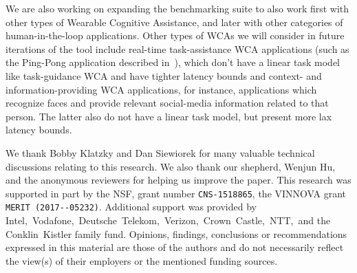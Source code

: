 We are also working on expanding the benchmarking suite to also work first with other types of Wearable Cognitive Assistance, and later with other categories of human-in-the-loop applications.
Other types of \glspl{WCA} we will consider in future iterations of the tool include real-time task-assistance \gls{WCA} applications (such as the Ping-Pong application described in~\cite{chen2017empirical}), which don't have a linear task model like task-guidance \gls{WCA} and have tighter latency bounds and context- and information-providing \gls{WCA} applications, for instance, applications which recognize faces and provide relevant social-media information related to that person.
The latter also do not have a linear task model, but present more lax latency bounds.

\begin{acks}
    We thank Bobby Klatzky and Dan Siewiorek for many valuable technical discussions relating to this research.
    We also thank our shepherd, Wenjun Hu, and the anonymous reviewers for helping us improve the paper.
    This research was supported in part by the \gls{NSF}, grant number \verb|CNS-1518865|, the VINNOVA grant \verb|MERIT (2017--05232)|.
    Additional support was provided by Intel,\ Vodafone,\ Deutsche~Telekom,\ Verizon,\ Crown~Castle,\ NTT,\ and the Conklin~Kistler family fund.
    Opinions, findings, conclusions or recommendations expressed in this material are those of the authors and do not necessarily reflect the view(s) of their employers or the mentioned funding sources.
\end{acks}
